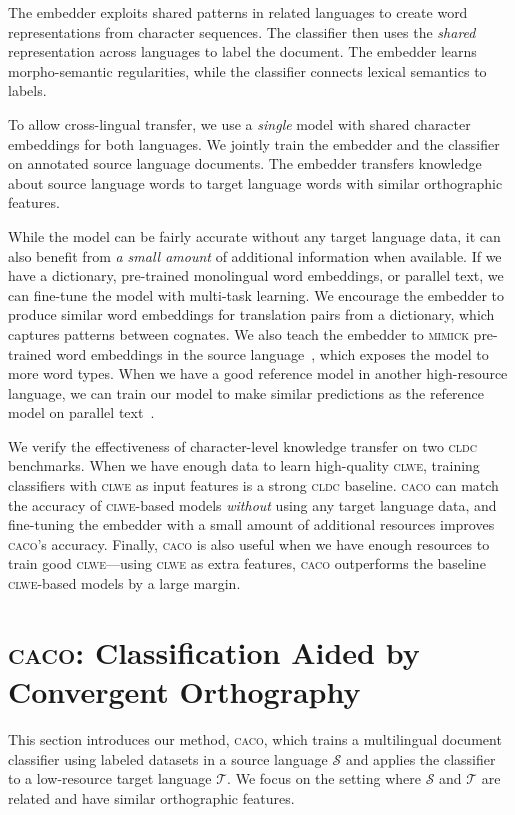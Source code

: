 \documentclass[letterpaper]{article} %
\newcommand{\citep}{\cite}
\newcommand{\abr}[1]{\textsc{#1}}
\newcommand{\name}[0]{\textsc{caco}}
\begin{document}
The embedder exploits shared patterns in related languages to
create word representations from character sequences.
The classifier then uses the \emph{shared} representation across
languages to label the document.
The embedder learns morpho-semantic regularities, while the
classifier connects lexical semantics to labels.

To allow cross-lingual transfer, we use a \emph{single} model with shared
character embeddings for both languages.
We jointly train the embedder and the classifier on annotated source
language documents.
The embedder transfers knowledge about source language words to target language
words with similar orthographic features.

While the model can be fairly accurate without any target language data, it can
also benefit from \emph{a small amount} of additional information when
available.  If we have a dictionary, pre-trained monolingual word embeddings,
or parallel text, we can fine-tune the model with multi-task learning.
We encourage the embedder to produce similar word embeddings for translation
pairs from a dictionary, which captures patterns between cognates.
We also teach the embedder to \abr{mimick} pre-trained word embeddings
in the source language~\citep{pinter-17}, which exposes the model to
more word types.
When we have a good reference model in another high-resource language, we can
train our model to make similar predictions as the reference model on
parallel text~\citep{xu-17}.

We verify the effectiveness of character-level knowledge transfer on two
\abr{cldc} benchmarks.
When we have enough data to learn high-quality \abr{clwe}, training classifiers
with \abr{clwe} as input features is a strong \abr{cldc} baseline.
\name{} can match the accuracy of \abr{clwe}-based models \emph{without}
using any target language data, and fine-tuning the embedder with a
small amount of additional resources improves \name{}'s accuracy.
Finally, \name{} is also useful when we have enough resources to train
good \abr{clwe}---using \abr{clwe} as extra features, \name{} outperforms the
baseline \abr{clwe}-based models by a large margin.

\section{\name{}: Classification Aided by Convergent Orthography}
\label{sec:model}

This section introduces our method, \name{}, which trains a multilingual
document classifier using labeled datasets in a source language $\mathcal{S}$
and applies the classifier to a low-resource target language $\mathcal{T}$.
We focus on the setting where $\mathcal{S}$ and $\mathcal{T}$ are related and
have similar orthographic features.
\end{document}
